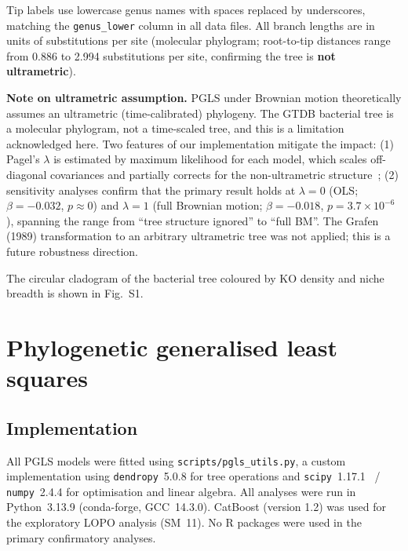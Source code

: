 \documentclass[11pt]{article}
\begin{document}
Tip labels use lowercase genus names with spaces replaced by underscores,
matching the \texttt{genus\_lower} column in all data files.  All branch
lengths are in units of substitutions per site (molecular phylogram;
root-to-tip distances range from 0.886 to 2.994 substitutions per site,
confirming the tree is \textbf{not ultrametric}).

\textbf{Note on ultrametric assumption.} PGLS under Brownian motion
theoretically assumes an ultrametric (time-calibrated) phylogeny.  The GTDB
bacterial tree is a molecular phylogram, not a time-scaled tree, and this is a
limitation acknowledged here.  Two features of our implementation mitigate the
impact: (1) Pagel's $\lambda$ is estimated by maximum likelihood for each model,
which scales off-diagonal covariances and partially corrects for the
non-ultrametric structure~\cite{pagel1999}; (2) sensitivity analyses confirm
that the primary result holds at $\lambda = 0$ (OLS; $\beta = -0.032$,
$p \approx 0$) and $\lambda = 1$ (full Brownian motion; $\beta = -0.018$,
$p = 3.7 \times 10^{-6}$), spanning the range from ``tree structure ignored''
to ``full BM''.  The Grafen (1989) transformation to an arbitrary ultrametric
tree was not applied; this is a future robustness direction.

The circular cladogram of the bacterial tree coloured by KO density and niche
breadth is shown in Fig.~S1.

\section{Phylogenetic generalised least squares}
\label{sm:pgls}

\subsection{Implementation}

All PGLS models were fitted using \texttt{scripts/pgls\_utils.py}, a custom
implementation using \texttt{dendropy}~5.0.8 for tree operations and
\texttt{scipy}~1.17.1~\cite{virtanen2020} / \texttt{numpy}~2.4.4 for
optimisation and linear algebra. All analyses were run in Python~3.13.9
(conda-forge, GCC~14.3.0). CatBoost (version 1.2) was used for the
exploratory LOPO analysis (SM~11). No R packages were used in the primary
confirmatory analyses.
\end{document}
